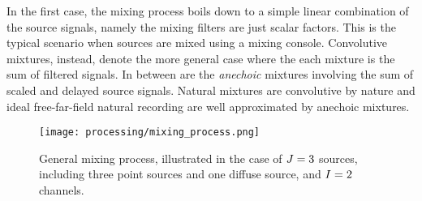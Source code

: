 In the first case, the mixing process boils down to a simple linear combination of the source signals, namely
the mixing filters are just scalar factors.
This is the typical scenario when sources are mixed using a mixing console.
Convolutive mixtures, instead, denote the more general case where the each mixture is the sum of filtered signals.
In between are the \textit{anechoic} mixtures involving the sum of scaled and delayed source signals.
Natural mixtures are convolutive by nature and ideal free-far-field natural recording are well approximated by anechoic mixtures.

\begin{figure}[t]
    \begin{fullwidth}
        \texttt{[image: processing/mixing\_process.png]}

        \caption{General mixing process, illustrated in the case of $J = 3$ sources,
        including three point sources and one diffuse source, and $I = 2$ channels.}

        \label{fig:processing:mixing}
    \end{fullwidth}
\end{figure}


